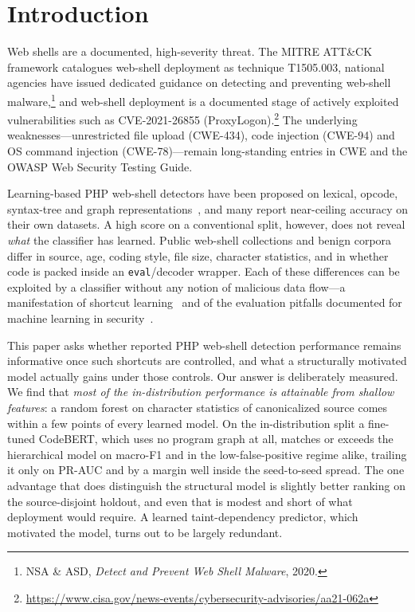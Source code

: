 \documentclass[pdflatex,sn-mathphys-num]{sn-jnl}
\begin{document}

\maketitle

\section{Introduction}\label{sec:intro}
Web shells are a documented, high-severity threat. The MITRE ATT\&CK framework
catalogues web-shell deployment as technique T1505.003, national agencies have
issued dedicated guidance on detecting and preventing web-shell
malware,\footnote{NSA \& ASD, \emph{Detect and Prevent Web Shell Malware}, 2020.}
and web-shell deployment is a documented stage of actively exploited
vulnerabilities such as CVE-2021-26855 (ProxyLogon).\footnote{\url{https://www.cisa.gov/news-events/cybersecurity-advisories/aa21-062a}}
The underlying weaknesses---unrestricted file upload (CWE-434), code injection
(CWE-94) and OS command injection (CWE-78)---remain long-standing entries in
CWE and the OWASP Web Security Testing Guide.

Learning-based PHP web-shell detectors have been proposed on lexical, opcode,
syntax-tree and graph representations~\cite{survey2024,astdf2024,glareshell2024},
and many report near-ceiling accuracy on their own datasets. A high score on a
conventional split, however, does not reveal \emph{what} the classifier has
learned. Public web-shell collections and benign corpora differ in source,
age, coding style, file size, character statistics, and in whether code is
packed inside an \texttt{eval}/decoder wrapper. Each of these differences can
be exploited by a classifier without any notion of malicious data flow---a
manifestation of shortcut learning~\cite{geirhos2020shortcut} and of the
evaluation pitfalls documented for machine learning in
security~\cite{arp2022dos,pendlebury2019tesseract}.

This paper asks whether reported PHP web-shell detection performance remains
informative once such shortcuts are controlled, and what a structurally
motivated model actually gains under those controls. Our answer is
deliberately measured. We find that \emph{most of the in-distribution
performance is attainable from shallow features}: a random forest on character
statistics of canonicalized source comes within a few points of every learned
model. On the in-distribution split a fine-tuned CodeBERT, which uses no
program graph at all, matches or exceeds the hierarchical model on macro-F1 and
in the low-false-positive regime alike, trailing it only on PR-AUC and by a
margin well inside the seed-to-seed spread. The one advantage
that does distinguish the structural model is slightly better ranking on the
source-disjoint holdout, and even that is modest and short of what deployment
would require. A learned taint-dependency predictor, which motivated the
model, turns out to be largely redundant.
\end{document}
